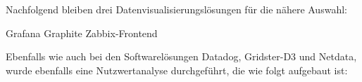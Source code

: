 Nachfolgend bleiben drei Datenvisualisierungslösungen für die nähere Auswahl:

\begin{outline}
  \1 Grafana
  \1 Graphite
  \1 Zabbix\hyp{}Frontend
\end{outline}

Ebenfalls wie auch bei den Softwarelösungen Datadog, Gridster\hyp{}D3 und
Netdata, wurde ebenfalls eine Nutzwertanalyse durchgeführt, die wie folgt
aufgebaut ist:

\begin{table}[H]
\caption{Nutzwertanalyse Grafana, Graphite und Zabbix-Frontend}
\label{nwa_ggz}
\end{table}

